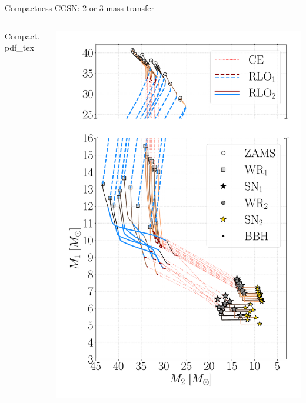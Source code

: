 \documentclass{beamer} %
\begin{document}
\begin{frame}{Compactness CCSN: 2 or 3 mass transfer}
	\begin{columns}
		\begin{column}{0.5\textwidth}
			\tiny
			\def\svgwidth{1.2\textwidth}
			{Compact.pdf_tex} 			
		\end{column}
		\hspace{1cm}
		\begin{column}{0.5\textwidth}
				\includegraphics[width=\textwidth]{./images/com_Mass_1_Mass_0_BHBH_GW_WRBH_cyg_x-3--Ko17.pdf}
		\end{column}	
	\end{columns}
\end{frame}
\end{document}
